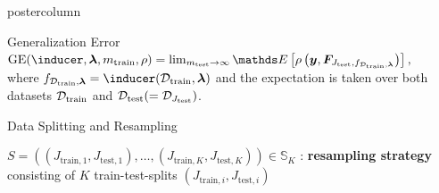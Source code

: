 \documentclass{beamer}
\begin{document}
\begin{frame}[fragile]{}
\begin{columns}
\begin{column}{.31\textwidth}
\begin{beamercolorbox}[center]{postercolumn}
\begin{minipage}{.98\textwidth}
{\begin{myblock}{Generalization Error}
 $\mathrm{GE}(\inducer, \bm{\lambda}, m_{\mathrm{train}}, \rho) = \lim_{m_{\mathrm{test}}\rightarrow\infty} \E \left[ \rho\left(\boldsymbol{y}, \boldsymbol{F}_{J_{\mathrm{test}},f_{\mathcal{D}_{\mathrm{train}}, \bm{\lambda}}}\right)\right],$ \\
 
where $f_{\mathcal{D}_{\mathrm{train}}, \bm{\lambda}} = \inducer(\mathcal{D}_{\mathrm{train}}, \bm{\lambda})$ and the expectation is taken over both datasets $\mathcal{D}_{\text{train}}$ and $\mathcal{D}_{\text{test}} (= \mathcal{D}_{J_\mathrm{test}})$.
\end{myblock}
\begin{myblock}{Data Splitting and Resampling}

$S = \left((J_{\mathrm{train},1}, J_{\mathrm{test},1}),\dots,
(J_{\mathrm{train},K}, J_{\mathrm{test},K})\right) \in \mathds{S}_K$ : \textbf{resampling strategy} consisting of $K$ train-test-splits $(J_{\mathrm{train},i}, J_{\mathrm{test},i})$\\


\end{myblock}}
\end{minipage}
\end{beamercolorbox}
\end{column}
\end{columns}
\end{frame}
\end{document}
